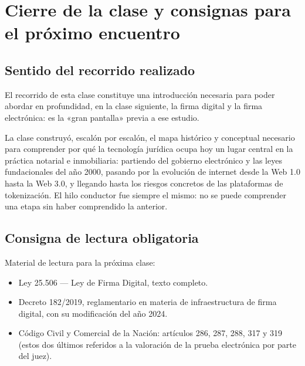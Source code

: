 \documentclass[12pt,oneside]{book}
\begin{document}
\chapter[Cierre y consignas]{Cierre de la clase y consignas para el próximo encuentro}
\label{cap:cierre}

\section{Sentido del recorrido realizado}

El recorrido de esta clase constituye una introducción necesaria para poder abordar en profundidad, en la clase siguiente, la firma digital y la firma electrónica: es la «gran pantalla» previa a ese estudio.

\begin{important}
La clase construyó, escalón por escalón, el mapa histórico y conceptual necesario para comprender por qué la tecnología jurídica ocupa hoy un lugar central en la práctica notarial e inmobiliaria: partiendo del gobierno electrónico y las leyes fundacionales del año 2000, pasando por la evolución de internet desde la Web 1.0 hasta la Web 3.0, y llegando hasta los riesgos concretos de las plataformas de tokenización. El hilo conductor fue siempre el mismo: no se puede comprender una etapa sin haber comprendido la anterior.
\end{important}


\section{Consigna de lectura obligatoria}

Material de lectura para la próxima clase:

\begin{itemize}
    \item Ley 25.506 --- Ley de Firma Digital, texto completo.
    \item Decreto 182/2019, reglamentario en materia de infraestructura de firma digital, con su modificación del año 2024.
    \item Código Civil y Comercial de la Nación: artículos 286, 287, 288, 317 y 319 (estos dos últimos referidos a la valoración de la prueba electrónica por parte del juez).
\end{itemize}
\end{document}
